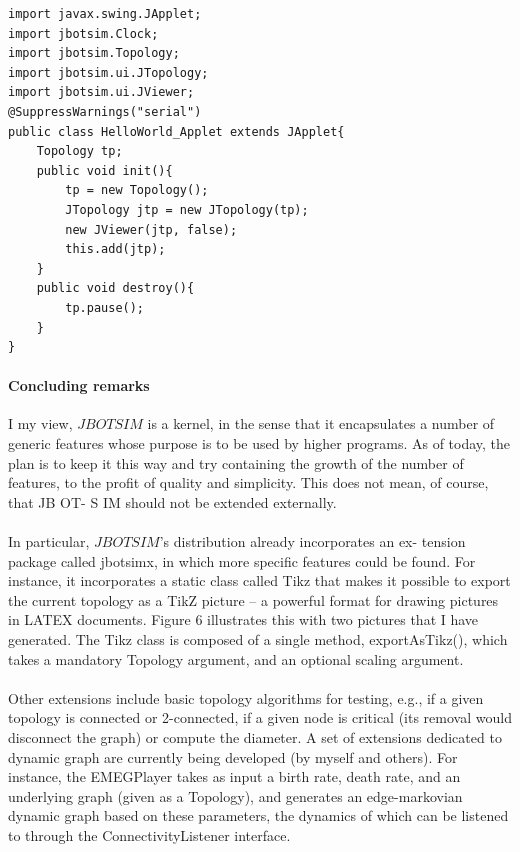 \begin{lstlisting}[caption=Embedding a $JBOTSIM$ demo into a java applet, captionpos=b]
import javax.swing.JApplet;
import jbotsim.Clock;
import jbotsim.Topology;
import jbotsim.ui.JTopology;
import jbotsim.ui.JViewer;
@SuppressWarnings("serial")
public class HelloWorld_Applet extends JApplet{
	Topology tp;
	public void init(){
		tp = new Topology();
		JTopology jtp = new JTopology(tp);
		new JViewer(jtp, false);
		this.add(jtp);
	}
	public void destroy(){
		tp.pause();
	}
}
\end{lstlisting}

\paragraph{Concluding remarks}I my view, $JBOTSIM$ is a kernel, in the sense that it encapsulates a number of generic features whose purpose is to be used by higher programs. As of today, the plan is to keep it this way and try containing the growth of the number of features, to the profit of quality and simplicity. This does not mean, of course, that JB OT- S IM should not be extended externally.
\paragraph{}In particular,  $JBOTSIM$’s distribution already incorporates an ex- tension package called jbotsimx, in which more specific features could be found. For instance, it incorporates a static class called Tikz that makes it possible to export the current topology as a TikZ picture – a powerful format for drawing pictures in LATEX documents. Figure 6 illustrates this with two pictures that I have generated. The Tikz class is composed of a single method, exportAsTikz(), which takes a mandatory Topology argument, and an optional scaling argument.
\paragraph{}Other extensions include basic topology algorithms for testing, e.g., if a given topology is connected or 2-connected, if a given node is critical (its removal would disconnect the graph) or compute the diameter. A set of extensions dedicated to dynamic graph are currently being developed (by myself and others). For instance, the EMEGPlayer takes as input a birth rate, death rate, and an underlying graph (given as a Topology), and generates an edge-markovian dynamic graph based on these parameters, the dynamics of which can be listened to through the ConnectivityListener interface.
